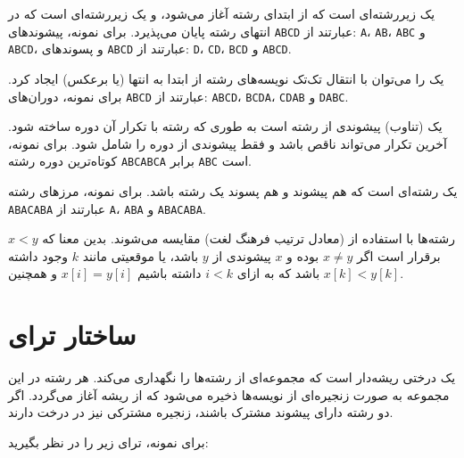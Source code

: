 
یک  زیررشته‌ای است که از ابتدای رشته آغاز می‌شود،
و یک  زیررشته‌ای است که در انتهای رشته پایان می‌پذیرد.
برای نمونه،
پیشوندهای \texttt{ABCD} عبارتند از:
\texttt{A}، \texttt{AB}، \texttt{ABC} و \texttt{ABCD}،
و پسوندهای \texttt{ABCD} عبارتند از:
\texttt{D}، \texttt{CD}، \texttt{BCD} و \texttt{ABCD}.


یک  را می‌توان با انتقال تک‌تک نویسه‌های رشته از ابتدا به انتها (یا برعکس) ایجاد کرد.
برای نمونه، دوران‌های \texttt{ABCD} عبارتند از:
\texttt{ABCD}، \texttt{BCDA}، \texttt{CDAB} و \texttt{DABC}.


یک  (تناوب) پیشوندی از رشته است به طوری که
رشته با تکرار آن دوره ساخته شود.
آخرین تکرار می‌تواند ناقص باشد و فقط
پیشوندی از دوره را شامل شود.
برای نمونه، کوتاه‌ترین دوره رشته
\texttt{ABCABCA} برابر \texttt{ABC} است.


یک  رشته‌ای است که هم
پیشوند و هم پسوند یک رشته باشد.
برای نمونه، مرزهای رشته \texttt{ABACABA}
عبارتند از \texttt{A}، \texttt{ABA} و \texttt{ABACABA}.


رشته‌ها با استفاده از 
(معادل ترتیب فرهنگ لغت) مقایسه می‌شوند.
بدین معنا که $x<y$ برقرار است اگر $x \neq y$ بوده و $x$ پیشوندی از $y$ باشد،
یا موقعیتی مانند $k$ وجود داشته باشد که
به ازای $i<k$ داشته باشیم $x[i]=y[i]$ و همچنین $x[k]<y[k]$.

\section{ساختار ترای}


یک  درختی ریشه‌دار است که
مجموعه‌ای از رشته‌ها را نگهداری می‌کند.
هر رشته در این مجموعه به صورت
زنجیره‌ای از نویسه‌ها ذخیره می‌شود که از ریشه آغاز می‌گردد.
اگر دو رشته دارای پیشوند مشترک باشند،
زنجیره مشترکی نیز در درخت دارند.

برای نمونه، ترای زیر را در نظر بگیرید:

